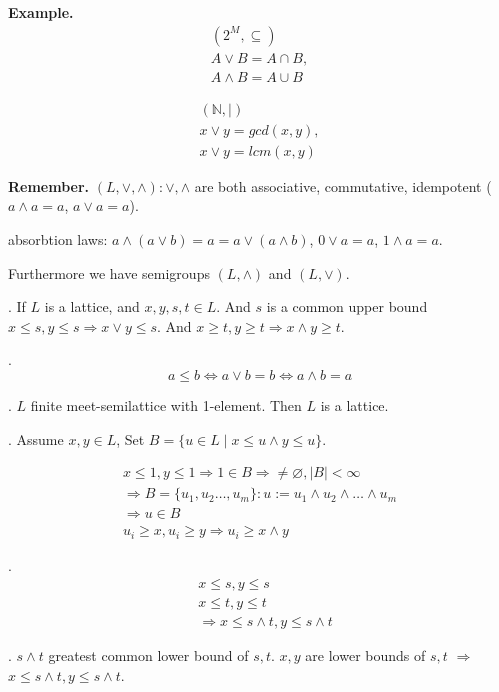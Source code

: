 \textbf{Example.}
\begin{align*}
  (2^M, \subseteq) \\
  A\vee B = A \cap B, \\
  A\wedge B = A \cup B
\end{align*}

\begin{align*}
  (\mathbb{N}, \mid) \\
  x \vee y = gcd(x,y), \\
  x \vee y = lcm(x,y)
\end{align*}

\textbf{Remember.}
$(L, \vee, \wedge): \vee, \wedge$ are both associative, commutative, idempotent ($a\wedge a = a$, $a\vee a = a$). 

absorbtion laws: $a \wedge(a \vee b) = a = a \vee ( a \wedge b)$, $0 \vee a = a$, $1 \wedge a = a$. 

Furthermore we have semigroups $(L, \wedge)$ and $(L, \vee)$.

\Lemma.
If $L$ is a lattice, and $x,y,s,t \in L$. And $s$ is a common upper bound $x \leq s, y \leq s \Rightarrow x \vee y \leq s$. 
And $x \geq t, y \geq t \Rightarrow x \wedge y \geq t$. 

\Remark.
\[
  a \leq b \Leftrightarrow a \vee b = b \Leftrightarrow a \wedge b = a
\]

\Lemma.
$L$ finite meet-semilattice with 1-element. Then $L$ is a lattice.

\Proof.
Assume $x,y \in L$, Set $B = \{u \in L \mid x \leq u \wedge y \leq u\}$. 

\begin{align*}
  x \leq 1, y \leq 1
    \Rightarrow 1 \in B \Rightarrow \neq \varnothing, |B| < \infty \\
  \Rightarrow B= \{u_1, u_2 \ldots , u_m\}: 
    u:= u_1 \wedge u_2 \wedge \ldots \wedge u_m \\
  \Rightarrow u \in B \\
  u_i \geq x, u_i \geq y \Rightarrow u_i \geq x \wedge y
\end{align*}


\Lemma.
\begin{align*}
  &x \leq s, y \leq s \\
  &x \leq t, y \leq t \\
  &\Rightarrow x \leq s \wedge t, y \leq s \wedge t
\end{align*}

\Proof.
$s \wedge t$ greatest common lower bound of $s,t$. 
$x,y$ are lower bounds of $s,t$ $\Rightarrow$ $x \leq s \wedge t, y \leq s \wedge t$. 

